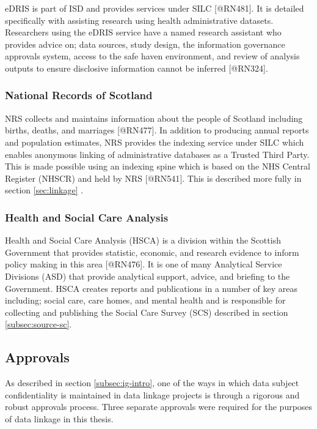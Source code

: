 \documentclass[]{article}
\begin{document}
eDRIS is part of ISD and provides services under SILC {[}@RN481{]}. It
is detailed specifically with assisting research using health
administrative datasets. Researchers using the eDRIS service have a
named research assistant who provides advice on; data sources, study
design, the information governance approvals system, access to the safe
haven environment, and review of analysis outputs to ensure disclosive
information cannot be inferred {[}@RN324{]}.

\subsubsection{National Records of Scotland}\label{subsec:nrs}

NRS collects and maintains information about the people of Scotland
including births, deaths, and marriages {[}@RN477{]}. In addition to
producing annual reports and population estimates, NRS provides the
indexing service under SILC which enables anonymous linking of
administrative databases as a Trusted Third Party. This is made possible
using an indexing spine which is based on the NHS Central Register
(NHSCR) and held by NRS {[}@RN541{]}. This is described more fully in
section \ref{sec:linkage} .

\subsubsection{Health and Social Care Analysis}\label{subsec:asd}

Health and Social Care Analysis (HSCA) is a division within the Scottish
Government that provides statistic, economic, and research evidence to
inform policy making in this area {[}@RN476{]}. It is one of many
Analytical Service Divisions (ASD) that provide analytical support,
advice, and briefing to the Government. HSCA creates reports and
publications in a number of key areas including; social care, care
homes, and mental health and is responsible for collecting and
publishing the Social Care Survey (SCS) described in section
\ref{subsec:source-sc}.

\subsection{Approvals}\label{subsec:data-approvals}

As described in section \ref{subsec:ig-intro}, one of the ways in which
data subject confidentiality is maintained in data linkage projects is
through a rigorous and robust approvals process. Three separate
approvals were required for the purposes of data linkage in this thesis.
\end{document}
